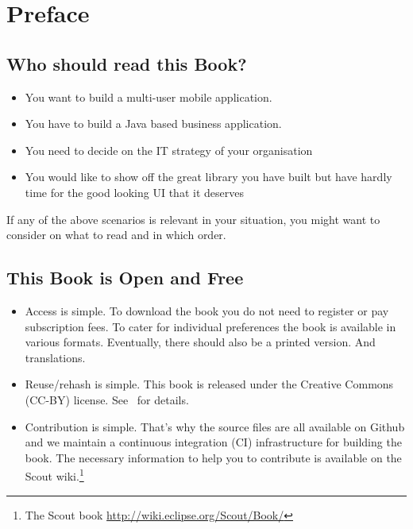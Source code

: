 \documentclass[a4paper,10pt,twoside]{book}
\begin{document}
  \sloppy
\fi


\chapter{Preface}


\section*{Who should read this Book?}

\begin{itemize}
\item You want to build a multi-user mobile application.
\item You have to build a Java based business application. 
\item You need to decide on the IT strategy of your organisation
\item You would like to show off the great library you have built but have hardly time for the good looking UI that it deserves
\end{itemize}

\noindent If any of the above scenarios is relevant in your situation, you might want to consider  on what to read and in which order.

\section*{This Book is Open and Free}

\begin{itemize}
\item Access is simple. 
To download the book you do not need to register or pay subscription fees. 
To cater for individual preferences the book is available in various formats. 
Eventually, there should also be a printed version. And translations.

\item Reuse/rehash is simple. 
This book is released under the Creative Commons (CC-BY) license. 
See~ for details.

\item Contribution is simple. 
That's why the source files are all available on Github and we maintain a continuous integration (CI) infrastructure for building the book. 
The necessary information to help you to contribute is available on the Scout
wiki.\footnote{The Scout book \url{http://wiki.eclipse.org/Scout/Book/}}
\end{itemize}
\end{document}
